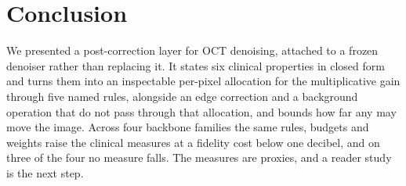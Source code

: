 \section{Conclusion}
\label{sec:conclusion}

We presented a post-correction layer for OCT denoising, attached to a frozen denoiser rather than
replacing it. It states six clinical properties in closed form and turns them into an inspectable per-pixel
allocation for the multiplicative gain through five named rules, alongside an edge correction and a
background operation that do not pass through that allocation, and bounds how far any may move the
image. Across four backbone families the same rules, budgets and weights raise the clinical measures
at a fidelity cost below one decibel, and on three of the four no measure falls. The measures are proxies, and a reader study is the next step.
